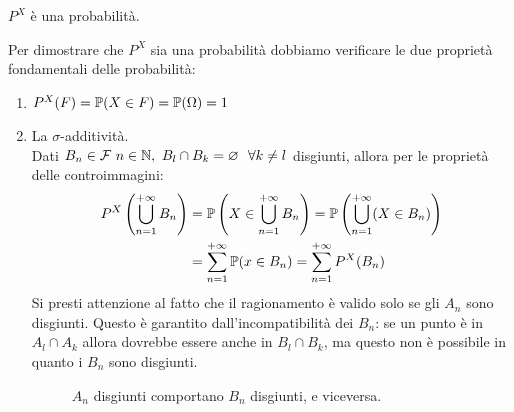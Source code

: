 \medskip
\begin{teob}[\JPTh{8.5}]
  $P^X$ è una probabilità.
\end{teob}
\begin{dimo}
  Per dimostrare che $P^X$ sia una probabilità dobbiamo verificare le due proprietà fondamentali delle probabilità:
  \begin{enumerate}
    \item $P^X(F) = \mathbb P(X \in F) = \mathbb P(\Omega) = 1$
    \item La $\sigma$-additività.\\
      Dati $B_n \in \mathcal F \ n \in \mathbb N, \ B_l \cap B_k = \varnothing \ \ \forall k \neq l$ disgiunti, allora per le proprietà delle controimmagini:
      \begin{align*}
        P^X \left(\bigcup\limits_{n=1}^{{+\infty}} B_n\right)
        &= \mathbb P\left(X \in \bigcup\limits_{n=1}^{{+\infty}} B_n\right)
        = \mathbb P\left(\bigcup\limits_{n=1}^{{+\infty}} (X \in B_n)\right)\\
        &= \sum\limits_{n=1}^{{+\infty}} \mathbb P(x\in B_n) = \sum\limits_{n=1}^{{+\infty}} P^X(B_n)
      \end{align*}
      Si presti attenzione al fatto che il ragionamento è valido solo se gli $A_n$ sono disgiunti. Questo è garantito dall'incompatibilità dei $B_n$: se un punto è in $A_l \cap A_k$ allora dovrebbe essere anche in $B_l \cap B_k$, ma questo non è possibile in quanto i $B_n$ sono disgiunti. \qedhere
      \begin{figure}[H]
        \centering
        \def\firstcircle{(0,0) circle (1cm)}
        \def\secondcircle{(-35:2.2cm) circle (1cm)}
        \def\drect {(-1.2,-2.5) rectangle (3,1.3)}
	\caption{$A_n$ disgiunti comportano $B_n$ disgiunti, e viceversa.}
      \end{figure}
  \end{enumerate}
\end{dimo}

